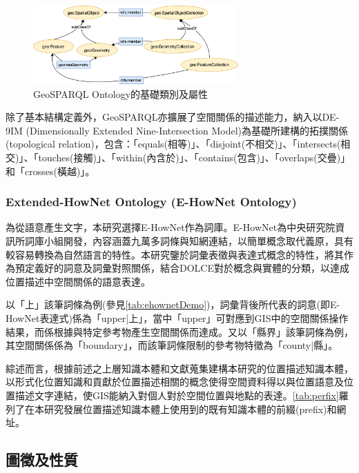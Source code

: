 \begin{figure}[!htbp]
\centering
\includegraphics[width = 0.7\textwidth]{figures/geosparql.png}
\caption{GeoSPARQL Ontology的基礎類別及屬性}
\label{fig:geosparql}
\end{figure}

除了基本結構定義外，GeoSPARQL亦擴展了空間關係的描述能力，納入以DE-9IM (Dimensionally Extended Nine-Intersection Model)為基礎所建構的拓撲關係(topological relation)，包含：「equals(相等)」、「disjoint(不相交)」、「intersects(相交)」、「touches(接觸)」、「within(內含於)」、「contains(包含)」、「overlaps(交疊)」和「crosses(橫越)」。

\subsubsection{Extended-HowNet Ontology (E-HowNet Ontology)}

為從語意產生文字，本研究選擇E-HowNet作為詞庫。E-HowNet為中央研究院資訊所詞庫小組開發，內容涵蓋九萬多詞條與知網連結，以簡單概念取代義原，具有較容易轉換為自然語言的特性\citep{RN186}。本研究鑒於詞彙表徵與表達式概念的特性，將其作為預定義好的詞意及詞彙對照關係，結合DOLCE對於概念與實體的分類，以達成位置描述中空間關係的語意表達。

以「上」該筆詞條為例(參見\ref{tab:ehownetDemo})，詞彙背後所代表的詞意(即E-HowNet表達式)係為「upper|上」，當中「upper」可對應到GIS中的空間關係操作結果，而係根據與特定參考物產生空間關係而達成。又以「縣界」該筆詞條為例，其空間關係係為「boundary」，而該筆詞條限制的參考物特徵為「county|縣」。

綜述而言，根據前述之上層知識本體和文獻蒐集建構本研究的位置描述知識本體，以形式化位置知識和貢獻於位置描述相關的概念使得空間資料得以與位置語意及位置描述文字連結，使GIS能納入對個人對於空間位置與地點的表達。\ref{tab:perfix}羅列了在本研究發展位置描述知識本體上使用到的既有知識本體的前綴(prefix)和網址。





\subsection{圖徵及性質}

